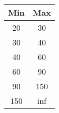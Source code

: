 %
\begin{tabular}{cc}
\hline 
Min & Max \\ \hline \hline
20 & 30 \\
30 & 40 \\
40 & 60 \\
60 & 90 \\
90 & 150 \\
150 & inf \\ \hline 
\end{tabular}
%
%